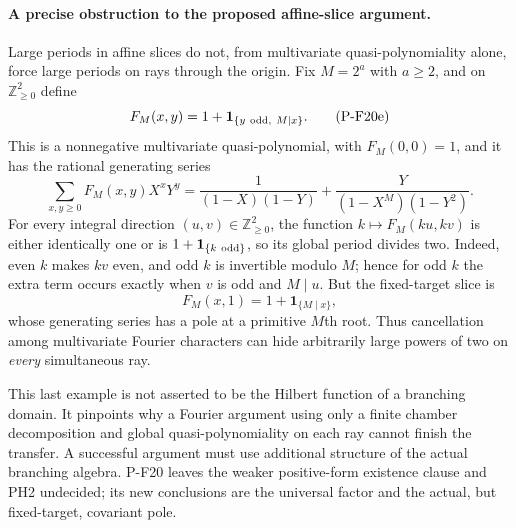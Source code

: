 \paragraph{A precise obstruction to the proposed affine-slice argument.}
Large periods in affine slices do not, from multivariate
quasi-polynomiality alone, force large periods on rays through the
origin. Fix $M=2^a$ with $a\ge2$, and on
$\mathbb Z_{\ge0}^2$ define
\[
 F_M(x,y)=1+\mathbf1_{\{y\ {\rm odd},\ M\mid x\}}.
 \tag{P-F20e}
\]
This is a nonnegative multivariate quasi-polynomial, with
$F_M(0,0)=1$, and it has the rational generating series
\[
 \sum_{x,y\ge0}F_M(x,y)X^xY^y
  =\frac1{(1-X)(1-Y)}+
       \frac{Y}{(1-X^M)(1-Y^2)}.
\]
For every integral direction $(u,v)\in\mathbb Z_{\ge0}^2$,
the function $k\mapsto F_M(ku,kv)$ is either identically one
or is $1+\mathbf1_{\{k\ {\rm odd}\}}$, so its global period
divides two. Indeed, even $k$ makes $kv$ even, and odd $k$ is
invertible modulo $M$; hence for odd $k$ the extra term occurs
exactly when $v$ is odd and $M\mid u$.
But the fixed-target slice is
\[
 F_M(x,1)=1+\mathbf1_{\{M\mid x\}},
\]
whose generating series has a pole at a primitive $M$th root.
Thus cancellation among multivariate Fourier characters can hide
arbitrarily large powers of two on \emph{every} simultaneous ray.

This last example is not asserted to be the Hilbert function of
a branching domain. It pinpoints why a Fourier argument using
only a finite chamber decomposition and global
quasi-polynomiality on each ray cannot finish the transfer.
A successful argument must use additional structure of the actual
branching algebra. P-F20 leaves the weaker positive-form existence
clause and PH2 undecided; its new conclusions are the universal
factor and the actual, but fixed-target, covariant pole.
